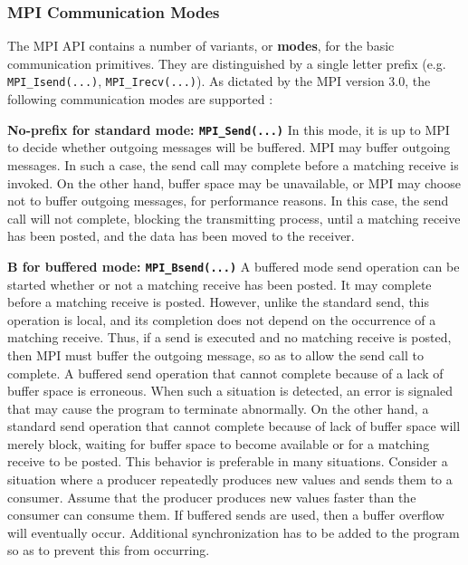 \documentclass[11pt]{article}
\begin{document}
\subsubsection{MPI Communication Modes}
\label{sec:orgd81ee2c}
The MPI API contains a number of variants, or \textbf{modes}, for the basic communication primitives.
They are distinguished by a single letter prefix (e.g. \texttt{MPI\_Isend(...)}, \texttt{MPI\_Irecv(...)}).
As dictated by the MPI version 3.0, the following communication modes are supported \cite{MessagePassingInterfaceForum2012}:

\textbf{No-prefix for standard mode: \texttt{MPI\_Send(...)}}
In this mode, it is up to MPI to decide whether outgoing messages will be buffered. 
MPI may buffer outgoing messages. 
In such a case, the send call may complete before a matching receive is invoked. 
On the other hand, buffer space may be unavailable, or MPI may choose not to buffer outgoing messages, for performance reasons. 
In this case, the send call will not complete, blocking the transmitting process, until a matching receive has been posted, and the data has been moved to the receiver.

\textbf{B for buffered mode: \texttt{MPI\_Bsend(...)}} 
A buffered mode send operation can be started whether or not a matching receive has been posted. 
It may complete before a matching receive is posted. 
However, unlike the standard send, this operation is local, and its completion does not depend on the occurrence of a matching receive. 
Thus, if a send is executed and no matching receive is posted, then MPI must buffer the outgoing message, so as to allow the send call to complete. 
A buffered send operation that cannot complete because of a lack of buffer space is erroneous. 
When such a situation is detected, an error is signaled that may cause the program to terminate abnormally. 
On the other hand, a standard send operation that cannot complete because of lack of buffer space will merely block, 
waiting for buffer space to become available or for a matching receive to be posted. 
This behavior is preferable in many situations. 
Consider a situation where a producer repeatedly produces new values and sends them to a consumer. 
Assume that the producer produces new values faster than the consumer can consume them. 
If buffered sends are used, then a buffer overflow will eventually occur. 
Additional synchronization has to be added to the program so as to prevent this from occurring. 
\end{document}
